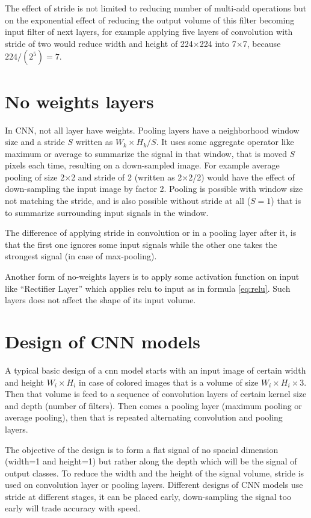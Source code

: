 The effect of stride is not limited to reducing number of multi-add operations but on the exponential
effect of reducing the output volume of this filter becoming input filter of next layers, for example
applying five layers of convolution with stride of two would reduce width and height of 224×224 into 7×7, because \(224/(2^5)=7\).

\section{No weights layers}

In CNN, not all layer have weights.
Pooling layers have a neighborhood window size and a stride \(S\) written as \(W_k\times H_k / S\).
It uses some aggregate operator like maximum or average to summarize the signal in that window,
that is moved \(S\) pixels each time, resulting on a down-sampled image.
For example average pooling of size 2×2 and stride of 2 (written as 2×2/2)
would have the effect of down-sampling the input image by factor 2.
Pooling is possible with window size not matching the stride,
and is also possible without stride at all (\(S=1\))
that is to summarize surrounding input signals in the window.

The difference of applying stride in convolution or in a pooling layer after it,
is that the first one ignores some input signals while the other one takes the strongest signal (in case of max-pooling).

Another form of no-weights layers is to apply some activation function on input like ``Rectifier Layer''
which applies \gls{relu}\autocite{hahnloser2001permitted}\autocite{jarrett2009best}\autocite{nair2010rectified} to input as in formula \ref{eq:relu}.
Such layers does not affect the shape of its input volume.

\section{Design of CNN models}

A typical basic design of a \gls{cnn} model starts with an input image of certain width and height \(W_{i}\times H_{i}\)
in case of colored images that is a volume of size \(W_{i}\times H_{i}\times 3\).
Then that volume is feed to a sequence of convolution layers of certain kernel size and depth (number of filters).
Then comes a pooling layer (maximum pooling or average pooling), then that is repeated alternating convolution and pooling layers.

The objective of the design is to form a flat signal of no spacial dimension (width=1 and height=1)
but rather along the depth which will be the signal of output classes.
To reduce the width and the height of the signal volume, stride is used on convolution layer or pooling layers.
Different designs of CNN models use stride at different stages, it can be placed early,
down-sampling the signal too early will trade accuracy with speed.

